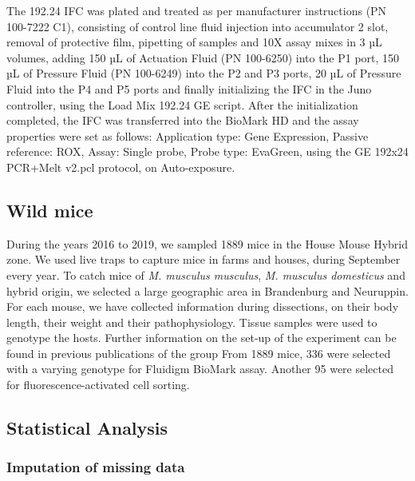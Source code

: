 \documentclass[webpdf,large,contemporary,namedate]{oup-authoring-template}
\theoremstyle{thmstyleone}
\theoremstyle{thmstyletwo}
\theoremstyle{thmstylethree}
\begin{document}
The 192.24 IFC was plated and treated as per manufacturer instructions
(PN 100-7222 C1), consisting of control line fluid injection into
accumulator 2 slot, removal of protective film, pipetting of samples and
10X assay mixes in 3 µL volumes, adding 150 µL of Actuation Fluid (PN
100-6250) into the P1 port, 150 µL of Pressure Fluid (PN 100-6249) into
the P2 and P3 ports, 20 µL of Pressure Fluid into the P4 and P5 ports
and finally initializing the IFC in the Juno controller, using the Load
Mix 192.24 GE script. After the initialization completed, the IFC was
transferred into the BioMark HD and the assay properties were set as
follows: Application type: Gene Expression, Passive reference: ROX,
Assay: Single probe, Probe type: EvaGreen, using the GE 192x24 PCR+Melt
v2.pcl protocol, on Auto-exposure.

\hypertarget{wild-mice}{%
\subsection{Wild mice}\label{wild-mice}}

During the years 2016 to 2019, we sampled 1889 mice in the House Mouse
Hybrid zone. We used live traps to capture mice in farms and houses,
during September every year. To catch mice of \emph{M. musculus
musculus}, \emph{M. musculus domesticus} and hybrid origin, we selected
a large geographic area in Brandenburg and Neuruppin. For each mouse, we
have collected information during dissections, on their body length,
their weight and their pathophysiology. Tissue samples were used to
genotype the hosts. Further information on the set-up of the experiment
can be found in previous publications of the group
\citet{balard2020intensity} From 1889 mice, 336 were selected with a
varying genotype for Fluidigm BioMark assay. Another 95 were selected
for fluorescence-activated cell sorting.

\hypertarget{statistical-analysis}{%
\subsection{Statistical Analysis}\label{statistical-analysis}}

\hypertarget{imputation-of-missing-data}{%
\subsubsection{Imputation of missing
data}\label{imputation-of-missing-data}}
\end{document}
